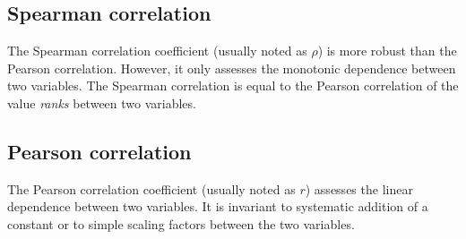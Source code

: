 \subsection{Spearman correlation}\label{subsec:SpearmanCor}
The Spearman correlation coefficient (usually noted as $\rho$)
is more robust than the Pearson correlation.
However, it only assesses the monotonic dependence between two variables.
The Spearman correlation is equal to the Pearson correlation of the value
\emph{ranks} between two variables.

\subsection{Pearson correlation}\label{subsec:PearsonCor}
The Pearson correlation coefficient (usually noted as $r$) assesses the linear
dependence between two variables. It is invariant to systematic addition of a
constant or to simple scaling factors between the two variables.

